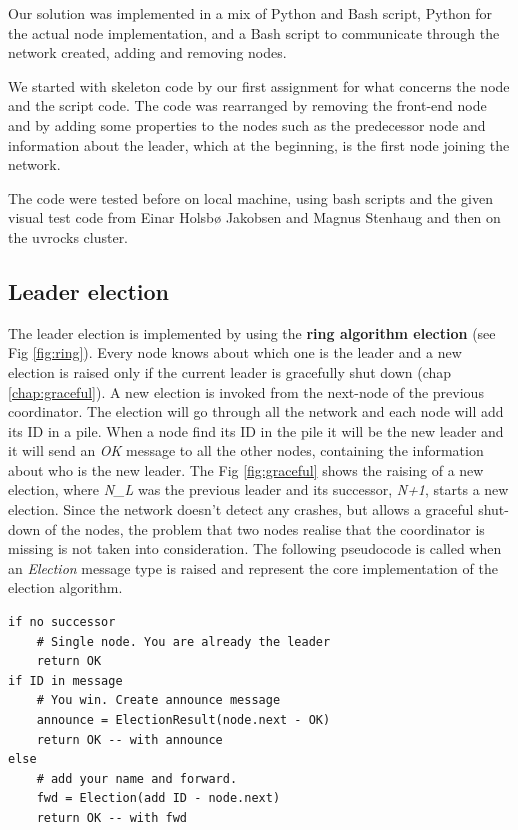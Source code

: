 \documentclass[11pt,conference]{IEEEtran}
\begin{document}
Our solution was implemented in a mix of Python and Bash script, Python for the
actual node implementation, and a Bash script to communicate through the network created, adding and removing nodes.

We started with skeleton code by our first assignment for what concerns the node and the script code. 
The code was rearranged by removing the front-end node and by adding some properties to the nodes such as the predecessor node and information about the leader, which at the beginning, is the first node joining the network.

The code were tested before on local machine, using bash scripts and the given visual test code from Einar Holsbø Jakobsen and Magnus Stenhaug and then on the uvrocks cluster.

\subsection{Leader election}
The leader election is implemented by using the \textbf{ring algorithm election} (see Fig \ref{fig:ring}). Every node knows about which one is the leader and a new election is raised only if the current leader is gracefully shut down (chap \ref{chap:graceful}). A new election is invoked from the next-node of the previous coordinator. The election will go through all the network and each node will add its ID in a pile. When a node find its ID in the pile it will be the new leader and it will send an \textit{OK} message to all the other nodes, containing the information about who is the new leader. The Fig \ref{fig:graceful} shows the raising of a new election, where \textit{N\_L} was the previous leader and its successor, \textit{N+1}, starts a new election.
\newline
Since the network doesn't detect any crashes, but allows a graceful shut-down of the nodes, the problem that two nodes realise that the coordinator is missing is not taken into consideration.
\newline
The following pseudocode is called when an \textit{Election} message type is raised and represent the core implementation of the election algorithm.
\begin{lstlisting}
if no successor
    # Single node. You are already the leader
    return OK
if ID in message
    # You win. Create announce message
    announce = ElectionResult(node.next - OK)
    return OK -- with announce
else
    # add your name and forward.
    fwd = Election(add ID - node.next)
    return OK -- with fwd
\end{lstlisting}
\end{document}
